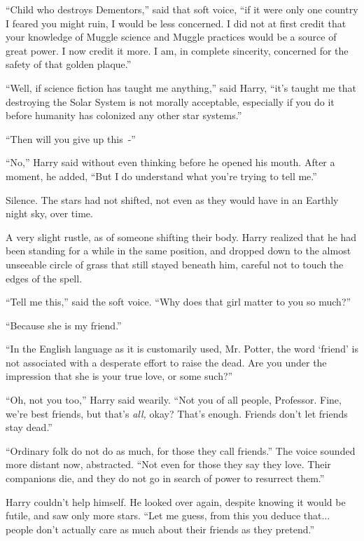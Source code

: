 ``Child who destroys Dementors,'' said that soft voice, ``if it were only one country I feared you might ruin, I would be less concerned. I did not at first credit that your knowledge of Muggle science and Muggle practices would be a source of great power. I now credit it more. I am, in complete sincerity, concerned for the safety of that golden plaque.''

``Well, if science fiction has taught me anything,'' said Harry, ``it's taught me that destroying the Solar System is not morally acceptable, especially if you do it before humanity has colonized any other star systems.''

``Then will you give up this~-''

``No,'' Harry said without even thinking before he opened his mouth. After a moment, he added, ``But I do understand what you're trying to tell me.''

Silence. The stars had not shifted, not even as they would have in an Earthly night sky, over time.

A very slight rustle, as of someone shifting their body. Harry realized that he had been standing for a while in the same position, and dropped down to the almost unseeable circle of grass that still stayed beneath him, careful not to touch the edges of the spell.

``Tell me this,'' said the soft voice. ``Why does that girl matter to you so much?''

``Because she is my friend.''

``In the English language as it is customarily used, Mr. Potter, the word `friend' is not associated with a desperate effort to raise the dead. Are you under the impression that she is your true love, or some such?''

``Oh, not you too,'' Harry said wearily. ``Not you of all people, Professor. Fine, we're best friends, but that's \emph{all,} okay? That's enough. Friends don't let friends stay dead.''

``Ordinary folk do not do as much, for those they call friends.'' The voice sounded more distant now, abstracted. ``Not even for those they say they love. Their companions die, and they do not go in search of power to resurrect them.''

Harry couldn't help himself. He looked over again, despite knowing it would be futile, and saw only more stars. ``Let me guess, from this you deduce that... people don't actually care as much about their friends as they pretend.''

